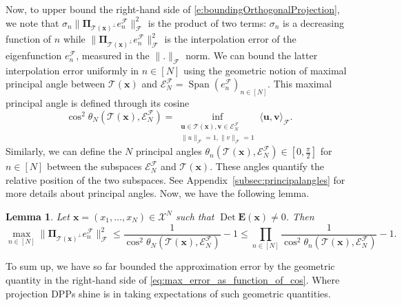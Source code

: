 \documentclass[twoside,11pt]{book}
\newtheorem{lemma}{Lemma}
\DeclareMathOperator{\Det}{Det}
\DeclareMathOperator{\Span}{\mathrm{Span}}
\newcommand{\ab}[1]{\textcolor{red}{#1}}
\newcommand{\rb}[1]{\textcolor{magenta}{#1}}
\begin{document}

Now, to upper bound the right-hand side of \eqref{e:boundingOrthogonalProjection}, we note that $\sigma_{n}\|\bm{\Pi}_{\mathcal{T}(\bm{x})^{\perp}} e_{n}^{\mathcal{F}}\|_{\mathcal{F}}^{2}$ is the product of two terms: $\sigma_{n}$ is a decreasing function of $n$ while $\|\bm{\Pi}_{\mathcal{T}(\bm{x})^{\perp}} e_{n}^{\mathcal{F}}\|_{\mathcal{F}}^{2}$ is the interpolation error of the eigenfunction $e_{n}^{\mathcal{F}}$, measured in the $\|.\|_{\mathcal{F}}$ norm.
We can bound the latter interpolation error uniformly in $n\in [N]$ using the geometric notion of maximal principal angle between $\mathcal{T}(\bm{x})$ and $\mathcal{E}^{\mathcal{F}}_{N} = \Span(e_{n}^{\mathcal{F}})_{ n \in [N]}$.
This maximal principal angle is defined through its cosine
\begin{equation}
	\cos^{2} \theta_{N}(\mathcal{T}(\bm{x}),\mathcal{E}^{\mathcal{F}}_{N}) = \inf\limits_{\substack{\bm{u} \in \mathcal{T}(\bm{x}), \bm{v} \in \mathcal{E}^{\mathcal{F}}_{N}\\ \|u\|_{\mathcal{F}} = 1, \|v\|_{\mathcal{F}} = 1}} \langle \bm{u}, \bm{v} \rangle_{\mathcal{F}}.
\end{equation}
Similarly, we can define the $N$ principal angles $\theta_{n}(\mathcal{T}(\bm{x}),\mathcal{E}^{\mathcal{F}}_{N}) \in \left[0, \frac{\pi}{2}\right]$ for $ n\in [N]$ between the subspaces $\mathcal{E}^{\mathcal{F}}_{N}$ and $\mathcal{T}(\bm{x})$. These angles quantify the relative position of the two subspaces. See Appendix~\ref{subsec:principalangles} for more details about principal angles.
Now, we have the following lemma.
\begin{lemma}\label{lemma:max_error_cos}
Let $\bm{x} = (x_{1}, \dots , x_{N}) \in \mathcal{X}^{N}$ such that $\Det \bm{E}(\bm{x}) \neq 0$. Then
\begin{equation}\label{eq:max_error_as_function_of_cos}
	\max_{ n \in [N]}\|\bm{\Pi}_{\mathcal{T}(\bm{x})^{\perp}} e_{n}^{\mathcal{F}}\|_{\mathcal{F}}^{2} \leq \frac{1}{\cos^{2} \theta_{N}(\mathcal{T}(\bm{x}),\mathcal{E}^{\mathcal{F}}_{N})} - 1  \leq \prod\limits_{n \in [N]}\frac{1}{\cos^{2} \theta_{n}(\mathcal{T}(\bm{x}),\mathcal{E}^{\mathcal{F}}_{N})} - 1.
\end{equation}
\end{lemma}
To sum up, we have so far bounded the approximation error by the geometric quantity in the right-hand side of \eqref{eq:max_error_as_function_of_cos}. Where projection DPPs shine is in taking expectations of such geometric quantities.
\end{document}
